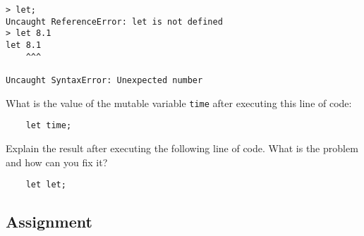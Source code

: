 \begin{lstlisting}[caption={\label{listing:intro-let-syntax-error}Several illegal uses of the keyword \texttt{let}.}]
> let;
Uncaught ReferenceError: let is not defined
> let 8.1
let 8.1
    ^^^

Uncaught SyntaxError: Unexpected number
\end{lstlisting}

\begin{question}
  What is the value of the mutable variable \texttt{time} after executing this line of code:
  \begin{lstlisting}
    let time;
  \end{lstlisting}
\end{question}

\begin{question}
  Explain the result after executing the following line of code. What is the problem and how can you fix it?
  \begin{lstlisting}
    let let;
  \end{lstlisting}
\end{question}

\subsection{Assignment}
